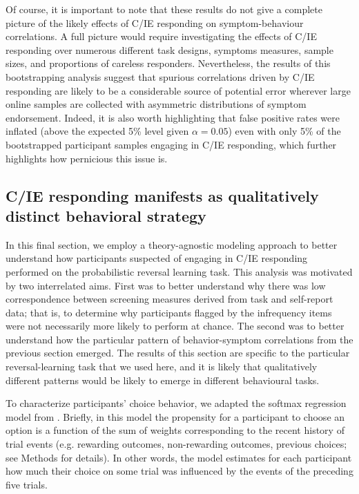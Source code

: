 \documentclass[a4paper,notitlepage,12pt]{article}
\begin{document}
Of course, it is important to note that these results do not give a complete picture of the likely effects of C/IE responding on symptom-behaviour correlations. A full picture would require investigating the effects of C/IE responding over numerous different task designs, symptoms measures, sample sizes, and proportions of careless responders. Nevertheless, the results of this bootstrapping analysis suggest that spurious correlations driven by C/IE responding are likely to be a considerable source of potential error wherever large online samples are collected with asymmetric distributions of symptom endorsement. Indeed, it is also worth highlighting that false positive rates were inflated (above the expected 5\% level given $\alpha = 0.05$) even with only 5\% of the bootstrapped participant samples engaging in C/IE responding, which further highlights how pernicious this issue is.

\subsection{C/IE responding manifests as qualitatively distinct behavioral strategy}

In this final section, we employ a theory-agnostic modeling approach to better understand how participants suspected of engaging in C/IE responding performed on the probabilistic reversal learning task. This analysis was motivated by two interrelated aims. First was to better understand why there was low correspondence between screening measures derived from task and self-report data; that is, to determine why participants flagged by the infrequency items were not necessarily more likely to perform at chance. The second was to better understand how the particular pattern of behavior-symptom correlations from the previous section emerged. The results of this section are specific to the particular reversal-learning task that we used here, and it is likely that qualitatively different patterns would be likely to emerge in different behavioural tasks.

To characterize participants' choice behavior, we adapted the softmax regression model from \cite{seymour2012serotonin}. Briefly, in this model the propensity for a participant to choose an option is a function of the sum of weights corresponding to the recent history of trial events (e.g. rewarding outcomes, non-rewarding outcomes, previous choices; see Methods for details). In other words, the model estimates for each participant how much their choice on some trial was influenced by the events of the preceding five trials.
\end{document}
